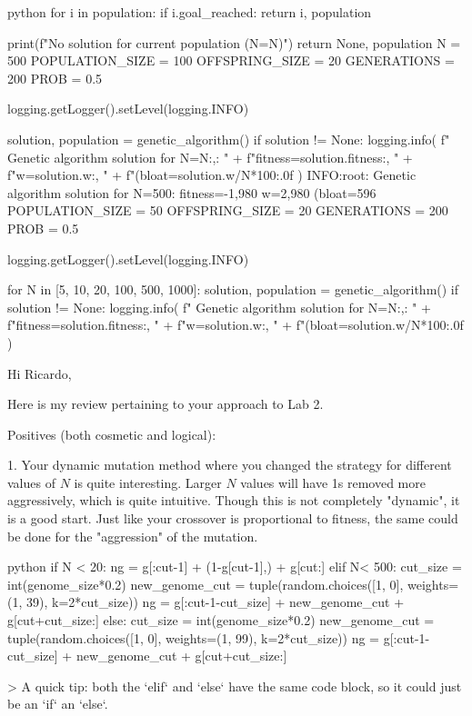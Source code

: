 \begin{mintedbox}{python}
      for i in population:
          if i.goal_reached:
              return i, population

      print(f"No solution for current population (N={N})")
      return None, population
  N = 500
  POPULATION_SIZE = 100
  OFFSPRING_SIZE = 20
  GENERATIONS = 200
  PROB = 0.5

  logging.getLogger().setLevel(logging.INFO)

  solution, population = genetic_algorithm()
  if solution != None:
      logging.info(
          f" Genetic algorithm solution for N={N:,}: "
          + f"fitness={solution.fitness:,} "
          + f"w={solution.w:,} "
          + f"(bloat={solution.w/N*100:.0f}%
      )
  INFO:root: Genetic algorithm solution for N=500: fitness=-1,980 w=2,980 (bloat=596%
  POPULATION_SIZE = 50
  OFFSPRING_SIZE = 20
  GENERATIONS = 200
  PROB = 0.5

  logging.getLogger().setLevel(logging.INFO)

  for N in [5, 10, 20, 100, 500, 1000]:
      solution, population = genetic_algorithm()
      if solution != None:
          logging.info(
              f" Genetic algorithm solution for N={N:,}: "
              + f"fitness={solution.fitness:,} "
              + f"w={solution.w:,} "
              + f"(bloat={solution.w/N*100:.0f}%
          )
\end{mintedbox}

Hi Ricardo,

Here is my review pertaining to your approach to Lab 2.

Positives (both cosmetic and logical):

1. Your dynamic mutation method where you changed the strategy for different values of $N$ is quite interesting. Larger $N$ values will have 1s removed more aggressively, which is quite intuitive. Though this is not completely "dynamic", it is a good start. Just like your crossover is proportional to fitness, the same could be done for the "aggression" of the mutation.

\begin{mintedbox}{python}
        if N < 20:
            ng = g[:cut-1] + (1-g[cut-1],) + g[cut:]
        elif N< 500:
            cut_size = int(genome_size*0.2)
            new_genome_cut = tuple(random.choices([1, 0], weights=(1, 39), k=2*cut_size))
            ng = g[:cut-1-cut_size] + new_genome_cut + g[cut+cut_size:]
        else:
            cut_size = int(genome_size*0.2)
            new_genome_cut = tuple(random.choices([1, 0], weights=(1, 99), k=2*cut_size))
            ng = g[:cut-1-cut_size] + new_genome_cut + g[cut+cut_size:]
\end{mintedbox}
> A quick tip: both the `elif` and `else` have the same code block, so it could just be an `if` an `else`.

